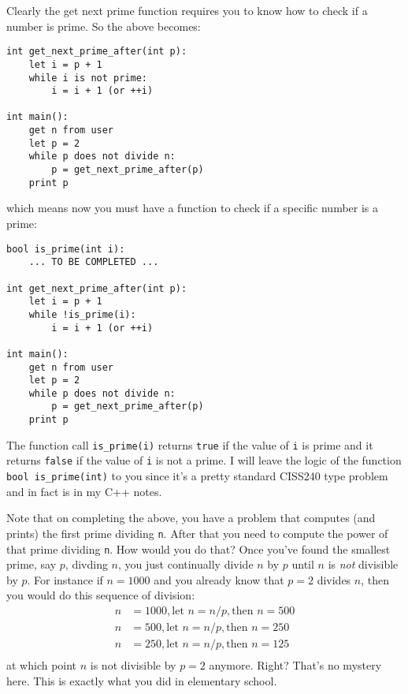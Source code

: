 Clearly the get next prime function requires you to know how to check if a number is
prime.
So the above becomes:
{\small
\begin{Verbatim}[frame=single]
int get_next_prime_after(int p):
    let i = p + 1
    while i is not prime:
        i = i + 1 (or ++i)

int main():
    get n from user
    let p = 2
    while p does not divide n:
        p = get_next_prime_after(p)
    print p
\end{Verbatim}
}
which means now you must have a function to check if a specific number is a
prime:
{\small
\begin{Verbatim}[frame=single]
bool is_prime(int i):
    ... TO BE COMPLETED ...
    
int get_next_prime_after(int p):
    let i = p + 1
    while !is_prime(i):
        i = i + 1 (or ++i)

int main():
    get n from user
    let p = 2
    while p does not divide n:
        p = get_next_prime_after(p)
    print p
\end{Verbatim}
}
The function call \verb!is_prime(i)! returns \verb!true!
if the value of \verb!i! is prime and it returns \verb!false!
if the value of \verb!i! is not a prime.
I will leave the logic of the function
\verb!bool is_prime(int)! to you since it's a pretty standard CISS240 type
problem and in fact is in my C++ notes.

Note that on completing the above, you have a problem that computes (and prints)
the first prime dividing \verb!n!.
After that you need to compute the power of that prime dividing \verb!n!.
How would you do that?
Once you've found the smallest prime, say $p$, divding $n$, you just continually
divide $n$ by $p$ until $n$ is \textit{not} divisible by $p$.
For instance if $n = 1000$ and you already know that $p = 2$ divides $n$,
then you would do this sequence of division:
\begin{align*}
  n &= 1000, \text{let } n = n / p, \text{then } n = 500 \\
  n &= 500, \text{let } n = n / p, \text{then }  n = 250 \\
  n &= 250, \text{let } n = n / p, \text{then }  n = 125 \\
\end{align*}
at which point $n$ is not divisible by $p = 2$ anymore.
Right?
That's no mystery here.
This is exactly what you did in elementary school.

